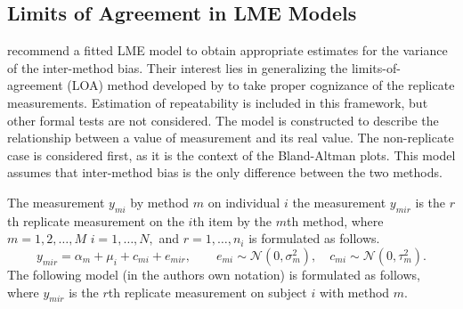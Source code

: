 \documentclass[12pt, a4paper]{report}
\theoremstyle{plain}
\theoremstyle{definition}
\theoremstyle{remark}
\begin{document}
	
\subsection*{Limits of Agreement in LME Models}
%	
	
\citet{BXC2008} recommend a fitted LME model to obtain appropriate estimates for the variance of the inter-method bias. Their interest lies in generalizing the limits-of-agreement (LOA) method developed by \citet{BA86} to take proper cognizance of the replicate measurements. Estimation of repeatability is included in this framework, but other formal tests are not considered. The model is constructed to describe the relationship between a value of measurement and its real value. The non-replicate case is considered first, as it is the context of the Bland-Altman plots. This model assumes that inter-method bias is the only difference between the two methods.		

	The measurement $y_{mi}$ by method $m$ on individual $i$ the measurement $y_{mir} $ is the $r$th replicate measurement on the $i$th item by the $m$th method, where $m=1,2,\ldots,M$ $i=1,\ldots,N,$ and $r = 1,\ldots,n_i$ is formulated as follows.
\begin{equation}
	y_{mir}  = \alpha_{m} + \mu_{i} + c_{mi} + e_{mir}, \qquad  e_{mi}
	\sim \mathcal{N}(0,\sigma^{2}_{m}), \quad c_{mi} \sim \mathcal{N}(0,\tau^{2}_{m}).
\end{equation}
The following model (in the authors own notation) is formulated as follows, where $y_{mir}$ is the $r$th replicate measurement on subject $i$ with method $m$. 
\end{document}
